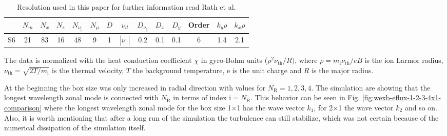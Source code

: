 \documentclass[aip, amsmath, amssymb, reprint, twocolumn]{revtex4-1}
\begin{document}
\begin{table}[ht]
	\begin{ruledtabular}
		\begin{tabular}{l | ccccc | ccccc | c | cc}
			& $N_m$ & $N_x$ & $N_s$ & $N_{\nu_\parallel}$ & $N_\mu$ & $D$ & $\nu_d$           & $D_{\nu_\parallel}$ & $D_x$ & $D_y$ & Order & $k_y\rho$ & $k_x\rho$ \\
			\hline
			S6   & 21    & 83    & 16    & 48                  & 9       & 1   & $|\nu_\parallel|$ & 0.2                 & 0.1   & 0.1   & 6     & 1.4       & 2.1       \\
		\end{tabular}
	\end{ruledtabular}
	\caption{
		Resolution used in this paper for further information read Rath et al. \cite{doi:10.1063/1.4961231} %
	}
	\label{tab:resolution}
\end{table}

The data is normalized with the heat conduction coefficient $\chi$ in gyro-Bohm units ($\rho^2\nu_{\mathrm{th}}/R)$, where $\rho = m_\mathrm{i}\nu_{\mathrm{th}}/eB$ is the ion Larmor radius, $\nu_{\mathrm{th}} = \sqrt{2T/m_\mathrm{i}}$ is the thermal velocity, $T$ the background temperature, e is the unit charge and $R$ is the major radius.  \bigskip



At the beginning the box size was only increased in radial direction with values for $N_\mathrm{R} = 1, 2, 3, 4$. The simulation are showing that the longest wavelength zonal mode is connected with $N_\mathrm{R}$ in terms of index $\mathrm{i} = N_\mathrm{R}$. This behavior can be seen in Fig. \ref{fig:wexb-eflux-1-2-3-4x1-comparison} where the longest wavelength zonal mode for the box size 1$\times$1 has the wave vector $k_1$, for 2$\times$1 the wave vector $k_2$ and so on. Also, it is worth mentioning that after a long run of the simulation the turbulence can still stabilize, which was not certain because of the numerical dissipation of the simulation itself. \cite{doi:10.1063/1.4961231}
\end{document}
